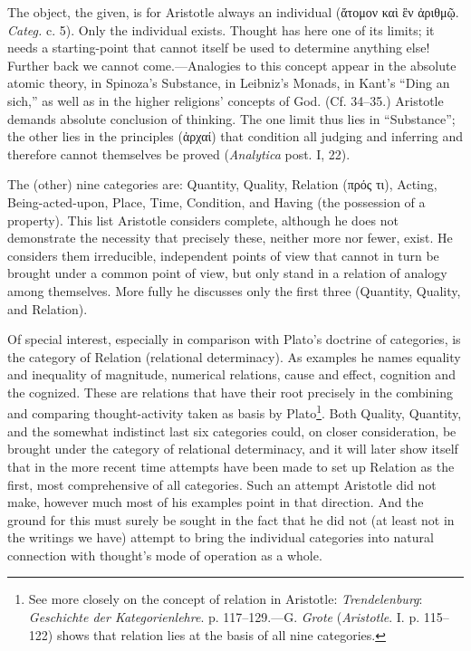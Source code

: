 \documentclass[12pt,a4paper]{book}
\newcommand{\opage}[1]{\marginnote{\footnotesize\textit{[#1]}}}
\begin{document}
The object, the given, is for Aristotle always an individual (ἄτομον καὶ ἓν
ἀριθμῷ. \emph{Categ.} c. 5). Only the individual exists. Thought has here
one of its limits; it needs a starting-point that cannot itself be used to
determine anything else! Further back we cannot come.---Analogies to this
concept appear in the absolute atomic theory, in Spinoza's Substance, in
Leibniz's Monads, in Kant's ``Ding an sich,'' as well as in the higher
religions' concepts of God. (Cf. 34--35.) Aristotle demands absolute
conclusion of thinking. The one limit thus lies in ``Substance''; the other
lies in the principles (ἀρχαί) that condition all judging and inferring and
therefore cannot themselves be proved (\emph{Analytica} post. I, 22).

The (other) nine categories are: Quantity, Quality, Relation (πρός τι),
Acting, Being-acted-upon, Place, Time, Condition, and Having (the
possession of a property). This list Aristotle considers complete, although
he does not demonstrate the necessity that precisely these, neither more
nor fewer, exist. He considers them irreducible, independent points of view
that cannot in turn be brought under a common point of view, but only stand
in a relation of analogy among themselves. More fully he discusses only the
first three (Quantity, Quality, and Relation).

Of special interest, especially in comparison with Plato's doctrine of
categories, is the category of Relation (relational determinacy). As
examples he names equality and inequality of magnitude, numerical
relations, cause and effect, cognition and the cognized. These are
relations that have their root precisely in the combining and comparing
thought-activity taken as basis by Plato\footnote{See more closely on the
concept of relation in Aristotle: \emph{Trendelenburg}: \emph{Geschichte
der Kategorienlehre}. p. 117--129.---G. \emph{Grote} (\emph{Aristotle}. I.
p. 115--122) shows that relation lies at the basis of all nine
categories.}. Both Quality, Quantity, and the \opage{143}somewhat indistinct last six categories could,
on closer consideration, be brought under the category of relational
determinacy, and it will later show itself that in the more recent time
attempts have been made to set up Relation as the first, most comprehensive
of all categories. Such an attempt Aristotle did not make, however much
most of his examples point in that direction. And the ground for this must
surely be sought in the fact that he did not (at least not in the writings
we have) attempt to bring the individual categories into natural connection
with thought's mode of operation as a whole.
\end{document}
